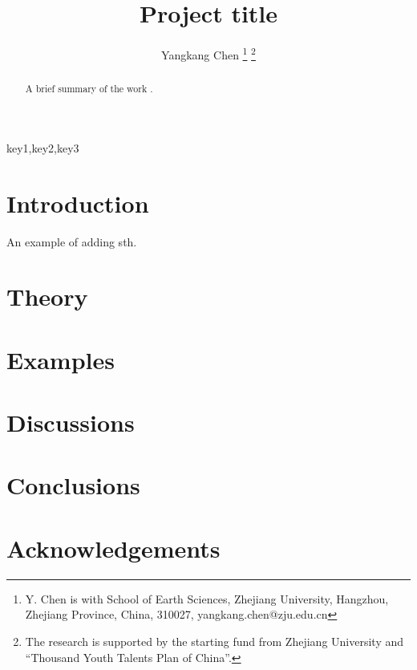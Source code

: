 \documentclass[10pt]{IEEEtran}
\DeclareRobustCommand{\old}[1]{}
\DeclareRobustCommand{\new}[1]{#1}
\begin{document}
\title{Project title}
\renewcommand{\thefootnote}{\fnsymbol{footnote}}
\author{Yangkang Chen
\thanks{Y. Chen is with School of Earth Sciences, Zhejiang University, Hangzhou, Zhejiang Province, China, 310027, yangkang.chen@zju.edu.cn}
\thanks{The research is supported by the starting fund from Zhejiang University and ``Thousand Youth Talents Plan of China''.}}
\maketitle

\begin{abstract}
A brief summary of the work \cite{yangkang20142}.
\end{abstract}

\begin{keywords}
key1,key2,key3
\end{keywords}

\section{Introduction}
\new{An example of adding sth.}\old{An example of deleting sth.}

\section{Theory}
\section{Examples}
\section{Discussions}
\section{Conclusions}
\section{Acknowledgements}





\end{document}
